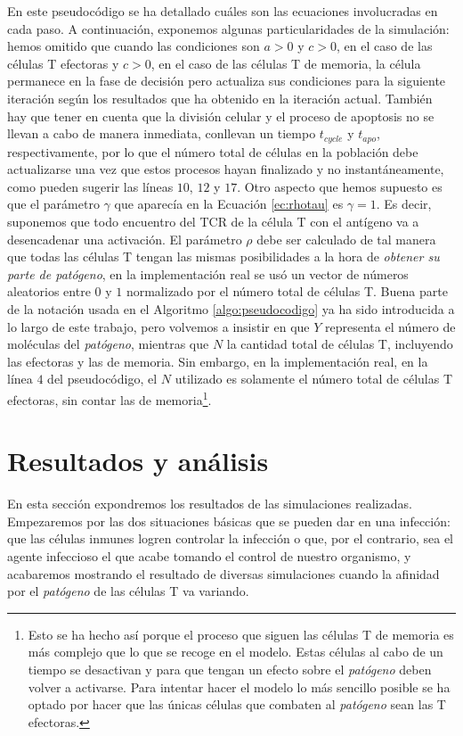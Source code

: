 En este pseudocódigo se ha detallado cuáles son las ecuaciones involucradas en cada paso. A continuación, exponemos algunas particularidades de la simulación: hemos omitido que cuando las condiciones son $a > 0$ y $c > 0$, en el caso de las células T efectoras y $c > 0$, en el caso de las células T de memoria, la célula permanece en la fase de decisión pero actualiza sus condiciones para la siguiente iteración según los resultados que ha obtenido en la iteración actual. También hay que tener en cuenta que la división celular y el proceso de apoptosis no se llevan a cabo de manera inmediata, conllevan un tiempo $t_{cycle}$ y $t_{apo}$, respectivamente, por lo que el número total de células en la población debe actualizarse una vez que estos procesos hayan finalizado y no instantáneamente, como pueden sugerir las líneas $10$, $12$ y $17$. Otro aspecto que hemos supuesto es que el parámetro $\gamma$ que aparecía en la Ecuación \ref{ec:rhotau} es $\gamma = 1$. Es decir, suponemos que todo encuentro del TCR de la célula T con el antígeno va a desencadenar una activación. El parámetro $\rho$ debe ser calculado de tal manera que todas las células T tengan las mismas posibilidades a la hora de \textit{obtener su parte de \textit{patógeno}}, en la implementación real se usó un vector de números aleatorios entre $0$ y $1$ normalizado por el número total de células T. Buena parte de la notación usada en el Algoritmo \ref{algo:pseudocodigo} ya ha sido introducida a lo largo de este trabajo, pero volvemos a insistir en que $Y$ representa el número de moléculas del \textit{patógeno}, mientras que $N$ la cantidad total de células T, incluyendo las efectoras y las de memoria. Sin embargo, en la implementación real, en la línea $4$ del pseudocódigo, el $N$ utilizado es solamente el número total de células T efectoras, sin contar las de memoria\footnote{Esto se ha hecho así porque el proceso que siguen las células T de memoria es más complejo que lo que se recoge en el modelo. Estas células al cabo de un tiempo se desactivan y para que tengan un efecto sobre el \textit{patógeno} deben volver a activarse. Para intentar hacer el modelo lo más sencillo posible se ha optado por hacer que las únicas células que combaten al \textit{patógeno} sean las T efectoras.}.

\section{Resultados y análisis}

En esta sección expondremos los resultados de las simulaciones realizadas. Empezaremos por las dos situaciones básicas que se pueden dar en una infección: que las células inmunes logren controlar la infección o que, por el contrario, sea el agente infeccioso el que acabe tomando el control de nuestro organismo, y acabaremos mostrando el resultado de diversas simulaciones cuando la afinidad por el \textit{patógeno} de las células T va variando.

